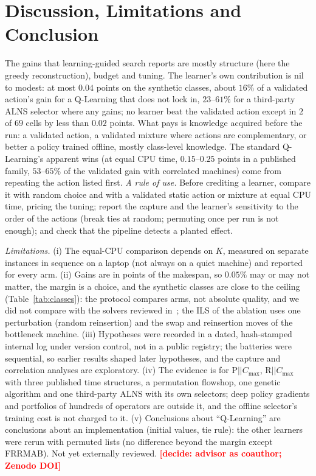 \documentclass[conference,a4paper]{IEEEtran}
\newif\ifdraftmarks \draftmarkstrue
\newcommand{\todonote}[1]{\ifdraftmarks\textcolor{red}{\textbf{[#1]}}\fi}
\newcommand{\Cmax}{C_{\max}}
\begin{document}
\section{Discussion, Limitations and Conclusion}
\label{sec:limits}
The gains that learning-guided search reports are mostly structure (here the greedy reconstruction), budget and tuning. The learner's own contribution is nil to modest: at most $0.04$ points on the synthetic classes, about $16\%$ of a validated action's gain for a Q-Learning that does not lock in, $23$--$61\%$ for a third-party ALNS selector where any gains; no learner beat the validated action except in $2$ of $69$ cells by less than $0.02$ points.
What pays is knowledge acquired before the run: a validated action, a validated mixture where actions are complementary, or better a policy trained offline, mostly class-level knowledge. The standard Q-Learning's apparent wins (at equal CPU time, $0.15$--$0.25$ points in a published family, $53$--$65\%$ of the validated gain with correlated machines) come from repeating the action listed first.
\emph{A rule of use.} Before crediting a learner, compare it with random choice and with a validated static action or mixture at equal CPU time, pricing the tuning; report the capture and the learner's sensitivity to the order of the actions (break ties at random; permuting once per run is not enough); and check that the pipeline detects a planted effect.

\emph{Limitations.} (i) The equal-CPU comparison depends on $K$, measured on separate instances in sequence on a laptop (not always on a quiet machine) and reported for every arm. (ii) Gains are in points of the makespan, so $0.05\%$ may or may not matter, the margin is a choice, and the synthetic classes are close to the ceiling (Table~\ref{tab:classes}): the protocol compares arms, not absolute quality, and we did not compare with the solvers reviewed in~\cite{OstojicEtAl2025}; the ILS of the ablation uses one perturbation (random reinsertion) and the swap and reinsertion moves of the bottleneck machine.
(iii) Hypotheses were recorded in a dated, hash-stamped internal log under version control, not in a public registry; the batteries were sequential, so earlier results shaped later hypotheses, and the capture and correlation analyses are exploratory.
(iv) The evidence is for P$||\Cmax$, R$||\Cmax$ with three published time structures, a permutation flowshop, one genetic algorithm and one third-party ALNS with its own selectors; deep policy gradients and portfolios of hundreds of operators are outside it, and the offline selector's training cost is not charged to it.
(v) Conclusions about ``Q-Learning'' are conclusions about an implementation (initial values, tie rule): the other learners were rerun with permuted lists (no difference beyond the margin except FRRMAB). Not yet externally reviewed. \todonote{decide: advisor as coauthor; Zenodo DOI}
\end{document}
